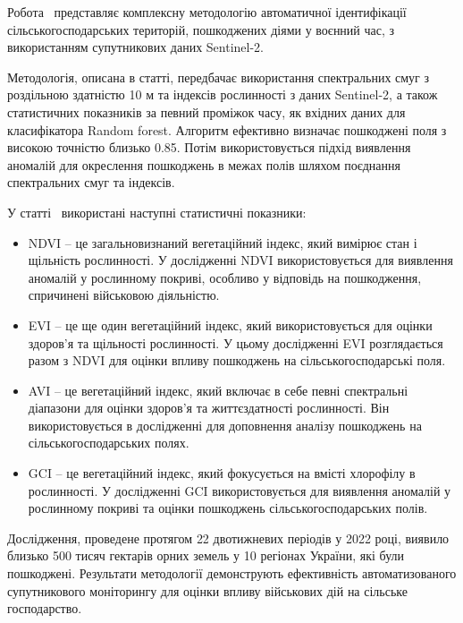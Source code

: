 Робота~\cite{kussul2023} представляє комплексну методологію автоматичної ідентифікації
сільськогосподарських територій, пошкоджених діями у воєнний
час, з використанням супутникових даних Sentinel-2.

Методологія, описана в статті, передбачає використання
спектральних смуг з роздільною здатністю 10 м та
індексів рослинності з даних Sentinel-2,
а також статистичних показників за певний проміжок часу,
як вхідних даних для класифікатора Random forest.
Алгоритм ефективно визначає пошкоджені поля з високою
точністю близько 0.85. Потім використовується підхід
виявлення аномалій для окреслення пошкоджень в межах
полів шляхом поєднання спектральних смуг та індексів.

У статті~\cite{kussul2023} використані наступні статистичні показники:

\begin{itemize}

      \item NDVI -- це загальновизнаний вегетаційний індекс, який вимірює стан і щільність
            рослинності. У дослідженні NDVI використовується для виявлення аномалій у
            рослинному покриві, особливо у відповідь на пошкодження, спричинені військовою
            діяльністю.
      \item EVI -- це ще один вегетаційний індекс, який використовується для оцінки
            здоров'я та щільності рослинності. У цьому дослідженні EVI розглядається разом
            з NDVI для оцінки впливу пошкоджень на сільськогосподарські поля.
      \item AVI -- це вегетаційний індекс, який включає в себе певні спектральні діапазони
            для оцінки здоров'я та життєздатності рослинності. Він використовується в
            дослідженні для доповнення аналізу пошкоджень на сільськогосподарських полях.
      \item GCI -- це вегетаційний індекс, який фокусується на вмісті хлорофілу в
            рослинності. У дослідженні GCI використовується для виявлення аномалій у
            рослинному покриві та оцінки пошкоджень сільськогосподарських полів.

\end{itemize}

Дослідження, проведене протягом 22
двотижневих періодів у 2022 році, виявило
близько 500 тисяч гектарів орних земель у
10 регіонах України, які були пошкоджені. Результати методології
демонструють ефективність автоматизованого супутникового
моніторингу для оцінки впливу військових дій на сільське
господарство.


